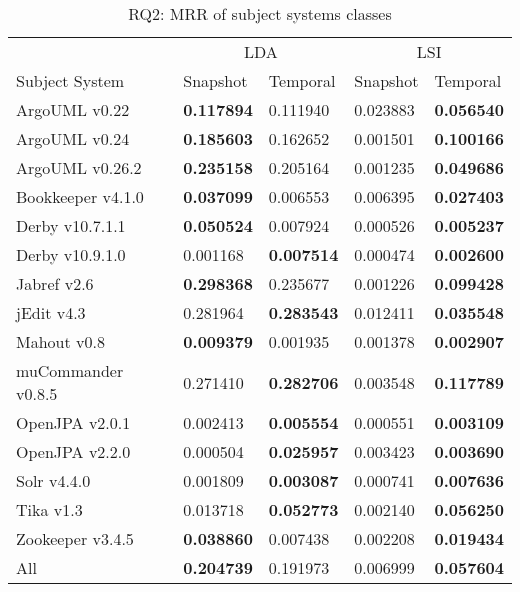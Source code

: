 \begin{table}[t]
\renewcommand{\arraystretch}{1.3}
\centering
\caption{RQ2: MRR of subject systems classes}
\begin{tabular}{l|ll|ll}
    \toprule
                        & \multicolumn{2}{c|}{LDA}      &  \multicolumn{2}{c}{LSI}  \\
    Subject System      & Snapshot      & Temporal      & Snapshot      & Temporal  \\
    \midrule
ArgoUML v0.22 & {\bf 0.117894 } & 0.111940 & 0.023883 & {\bf 0.056540 } \\
ArgoUML v0.24 & {\bf 0.185603 } & 0.162652 & 0.001501 & {\bf 0.100166 } \\
ArgoUML v0.26.2 & {\bf 0.235158 } & 0.205164 & 0.001235 & {\bf 0.049686 } \\
Bookkeeper v4.1.0 & {\bf 0.037099 } & 0.006553 & 0.006395 & {\bf 0.027403 } \\
Derby v10.7.1.1 & {\bf 0.050524 } & 0.007924 & 0.000526 & {\bf 0.005237 } \\
Derby v10.9.1.0 & 0.001168 & {\bf 0.007514 } & 0.000474 & {\bf 0.002600 } \\
Jabref v2.6 & {\bf 0.298368 } & 0.235677 & 0.001226 & {\bf 0.099428 } \\
jEdit v4.3 & 0.281964 & {\bf 0.283543 } & 0.012411 & {\bf 0.035548 } \\
Mahout v0.8 & {\bf 0.009379 } & 0.001935 & 0.001378 & {\bf 0.002907 } \\
muCommander v0.8.5 & 0.271410 & {\bf 0.282706 } & 0.003548 & {\bf 0.117789 } \\
OpenJPA v2.0.1 & 0.002413 & {\bf 0.005554 } & 0.000551 & {\bf 0.003109 } \\
OpenJPA v2.2.0 & 0.000504 & {\bf 0.025957 } & 0.003423 & {\bf 0.003690 } \\
Solr v4.4.0 & 0.001809 & {\bf 0.003087 } & 0.000741 & {\bf 0.007636 } \\
Tika v1.3 & 0.013718 & {\bf 0.052773 } & 0.002140 & {\bf 0.056250 } \\
Zookeeper v3.4.5 & {\bf 0.038860 } & 0.007438 & 0.002208 & {\bf 0.019434 } \\
    \midrule
All & {\bf 0.204739 } & 0.191973 & 0.006999 & {\bf 0.057604 } \\
    \bottomrule
\end{tabular}
\label{table:rq2:classes}
\end{table}


